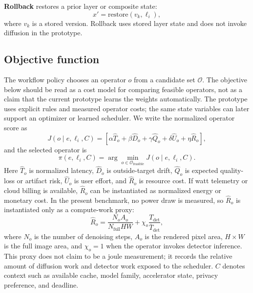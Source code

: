 \documentclass[final,5p,times,number,sort&compress]{elsarticle}
\newcommand{\policy}{\pi}
\begin{document}
\textbf{Rollback} restores a prior layer or composite state:
\begin{equation}
    x' = \mathrm{restore}(v_k, \ell_i),
\end{equation}
where \(v_k\) is a stored version. Rollback uses stored layer state and does not invoke diffusion in the prototype.

\subsection{Objective function}

The workflow policy chooses an operator \(o\) from a candidate set \(\mathcal{O}\). The objective below should be read as a cost model for comparing feasible operators, not as a claim that the current prototype learns the weights automatically. The prototype uses explicit rules and measured operator costs; the same state variables can later support an optimizer or learned scheduler. We write the normalized operator score as
\begin{equation}
    J(o \mid e,\ell_i,C) =
    \left[
    \alpha \widehat{T}_o + \beta \widehat{D}_o + \gamma \widehat{Q}_o + \delta \widehat{U}_o + \eta \widehat{R}_o
    \right],
\end{equation}
and the selected operator is
\begin{equation}
    \policy(e,\ell_i,C) = \arg\min_{o \in \mathcal{O}_{\mathrm{feasible}}} J(o \mid e,\ell_i,C).
\end{equation}
Here \(\widehat{T}_o\) is normalized latency, \(\widehat{D}_o\) is outside-target drift, \(\widehat{Q}_o\) is expected quality-loss or artifact risk, \(\widehat{U}_o\) is user effort, and \(\widehat{R}_o\) is resource cost. If watt telemetry or cloud billing is available, \(\widehat{R}_o\) can be instantiated as normalized energy or monetary cost. In the present benchmark, no power draw is measured, so \(\widehat{R}_o\) is instantiated only as a compute-work proxy:
\begin{equation}
    \widehat{R}_o =
    \frac{N_o A_o}{N_{\mathrm{full}}HW}
    + \chi_o \frac{T_{\mathrm{det}}}{\bar{T}_{\mathrm{det}}},
\end{equation}
where \(N_o\) is the number of denoising steps, \(A_o\) is the rendered pixel area, \(H \times W\) is the full image area, and \(\chi_o=1\) when the operator invokes detector inference. This proxy does not claim to be a joule measurement; it records the relative amount of diffusion work and detector work exposed to the scheduler. \(C\) denotes context such as available cache, model family, accelerator state, privacy preference, and deadline.
\end{document}
